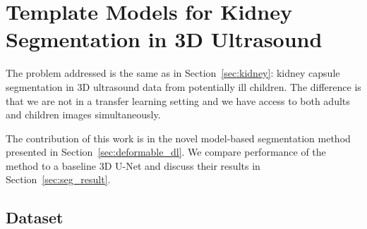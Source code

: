 \section{Template Models for Kidney Segmentation in 3D Ultrasound}

The problem addressed is the same as in Section~\ref{sec:kidney}: kidney capsule segmentation in 3D ultrasound data from potentially ill children. The difference is that we are not in a transfer learning setting and we have access to both adults and children images simultaneously.

The contribution of this work is in the novel model-based segmentation method presented in Section~\ref{sec:deformable_dl}. We compare performance of the method to a baseline 3D U-Net and discuss their results in Section~\ref{sec:seg_result}.

\subsection{Dataset}

